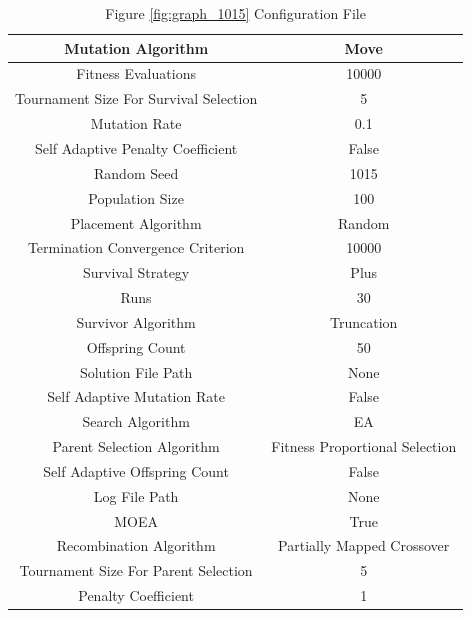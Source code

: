 \documentclass{standalone}
\begin{document}
\begin{table}[!htb]
	\centering
	\caption{Figure \ref{fig:graph_1015} Configuration File}
	\label{tab:graph_1015}
	\begin{tabular}{| c | c |}
		\hline
		Mutation Algorithm		& Move		 \\
		\hline
		Fitness Evaluations		& 10000		 \\
		\hline
		Tournament Size For Survival Selection		& 5		 \\
		\hline
		Mutation Rate		& 0.1		 \\
		\hline
		Self Adaptive Penalty Coefficient		& False		 \\
		\hline
		Random Seed		& 1015		 \\
		\hline
		Population Size		& 100		 \\
		\hline
		Placement Algorithm		& Random		 \\
		\hline
		Termination Convergence Criterion		& 10000		 \\
		\hline
		Survival Strategy		& Plus		 \\
		\hline
		Runs		& 30		 \\
		\hline
		Survivor Algorithm		& Truncation		 \\
		\hline
		Offspring Count		& 50		 \\
		\hline
		Solution File Path		& None		 \\
		\hline
		Self Adaptive Mutation Rate		& False		 \\
		\hline
		Search Algorithm		& EA		 \\
		\hline
		Parent Selection Algorithm		& Fitness Proportional Selection		 \\
		\hline
		Self Adaptive Offspring Count		& False		 \\
		\hline
		Log File Path		& None		 \\
		\hline
		MOEA		& True		 \\
		\hline
		Recombination Algorithm		& Partially Mapped Crossover		 \\
		\hline
		Tournament Size For Parent Selection		& 5		 \\
		\hline
		Penalty Coefficient		& 1		 \\
		\hline
	\end{tabular}
\end{table}
\end{document}
